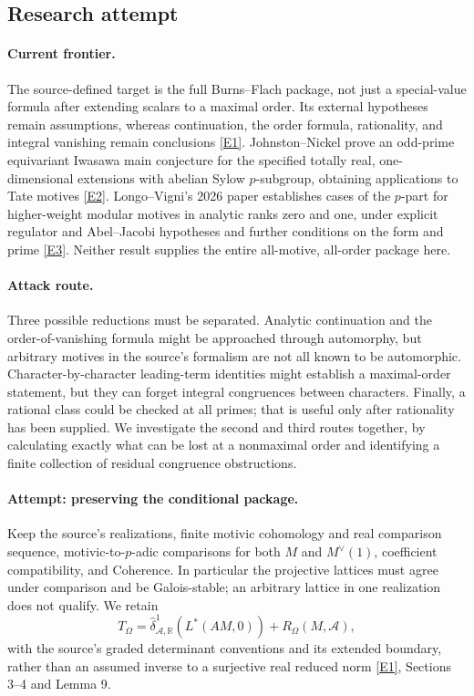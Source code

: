 \documentclass[11pt,a4paper]{article}
\newcommand{\R}{\mathbb{R}}
\newcommand{\eref}[2]{\hyperlink{extra:#1:#2}{[E#2]}}
\numberwithin{equation}{section}
\begin{document}
\subsection{Research attempt}

\paragraph{Current frontier.}
The source-defined target is the full Burns--Flach package, not just a special-value formula after extending scalars to a maximal order. Its external hypotheses remain assumptions, whereas continuation, the order formula, rationality, and integral vanishing remain conclusions \eref{statement}{1}. Johnston--Nickel prove an odd-prime equivariant Iwasawa main conjecture for the specified totally real, one-dimensional extensions with abelian Sylow $p$-subgroup, obtaining applications to Tate motives \eref{statement}{2}. Longo--Vigni's 2026 paper establishes cases of the $p$-part for higher-weight modular motives in analytic ranks zero and one, under explicit regulator and Abel--Jacobi hypotheses and further conditions on the form and prime \eref{statement}{3}. Neither result supplies the entire all-motive, all-order package here.

\paragraph{Attack route.}
Three possible reductions must be separated. Analytic continuation and the order-of-vanishing formula might be approached through automorphy, but arbitrary motives in the source's formalism are not all known to be automorphic. Character-by-character leading-term identities might establish a maximal-order statement, but they can forget integral congruences between characters. Finally, a rational class could be checked at all primes; that is useful only after rationality has been supplied. We investigate the second and third routes together, by calculating exactly what can be lost at a nonmaximal order and identifying a finite collection of residual congruence obstructions.

\paragraph{Attempt: preserving the conditional package.}
Keep the source's realizations, finite motivic cohomology and real comparison sequence, motivic-to-$p$-adic comparisons for both $M$ and $M^\vee(1)$, coefficient compatibility, and Coherence. In particular the projective lattices must agree under comparison and be Galois-stable; an arbitrary lattice in one realization does not qualify. We retain
\[
 T_\Omega=\widehat\delta^1_{\mathcal A,\R}(L^*(AM,0))
                       +R_\Omega(M,\mathcal A),
\]
with the source's graded determinant conventions and its extended boundary, rather than an assumed inverse to a surjective real reduced norm \eref{statement}{1}, Sections 3--4 and Lemma 9.
\end{document}
